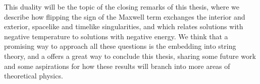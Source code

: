 This duality will be the topic of the closing remarks of this thesis, where we describe how flipping the sign of the Maxwell term exchanges the interior and exterior, spacelike and timelike singularities, and which relates solutions with negative temperature to solutions with negative energy. We think that a promising way to approach all these questions is the embedding into string theory, and a offers a great way to conclude this thesis, sharing some future work and some aspirations for how these results will branch into more areas of theoretical physics.
